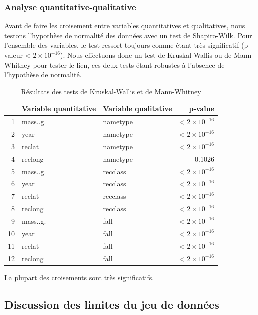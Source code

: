 \documentclass[12pt]{article}
\begin{document}
\subsubsection*{Analyse quantitative-qualitative}
Avant de faire les croisement entre variables quantitatives et qualitatives, nous testons l'hypothèse de normalité des données avec un test de Shapiro-Wilk. Pour l'ensemble des variables, le test ressort toujours comme étant très significatif (p-valeur < $2\times 10^{-16}$). Nous effectuons donc un test de Kruskal-Wallis ou de Mann-Whitney pour tester le lien, ces deux tests étant  robustes à l'absence de l'hypothèse de normalité.
\begin{table}[H]
\centering
\begin{tabular}{rllr}
  \hline
 & Variable quantitative & Variable qualitative & p-value \\ 
  \hline
1 & mass..g. & nametype & < $2\times 10^{-16}$ \\ 
  2 & year & nametype &< $2\times 10^{-16}$  \\ 
  3 & reclat & nametype &< $2\times 10^{-16}$ \\ 
  4 & reclong & nametype & 0.1026 \\ 
  5 & mass..g. & recclass & < $2\times 10^{-16}$  \\ 
  6 & year & recclass & < $2\times 10^{-16}$  \\ 
  7 & reclat & recclass & < $2\times 10^{-16}$  \\ 
  8 & reclong & recclass & < $2\times 10^{-16}$  \\ 
  9 & mass..g. & fall &< $2\times 10^{-16}$  \\ 
  10 & year & fall & < $2\times 10^{-16}$  \\ 
  11 & reclat & fall &< $2\times 10^{-16}$  \\ 
  12 & reclong & fall &< $2\times 10^{-16}$  \\ 
   \hline
\end{tabular}
\caption{Résultats des tests de Kruskal-Wallis et de Mann-Whitney}
\end{table}
La plupart des croisements sont très significatifs.
\subsection{Discussion des limites du jeu de données}
\end{document}

